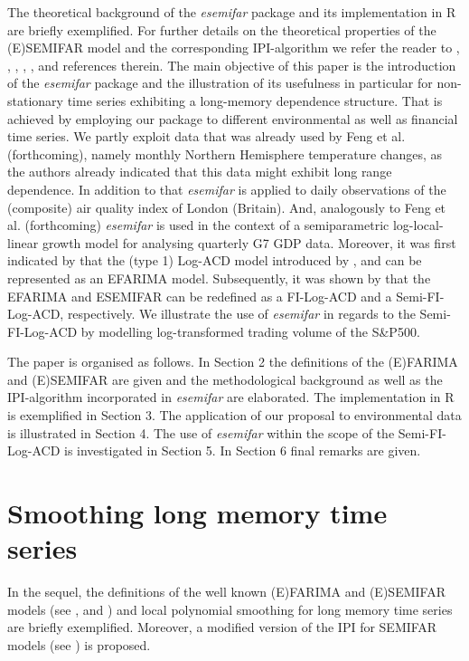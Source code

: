 \documentclass[12pt]{article}
\begin{document}
The theoretical background of the \textit{esemifar} package and its implementation in R are briefly exemplified. For further details on the theoretical properties of the (E)SEMIFAR model and the corresponding IPI-algorithm we refer the reader to \citet{beran1999semifar}, \citet{beran2002semifar}, \citet{beran2002iterative}, \citet{beran2002local}, \citet{beran2015modelling}, \citet{beran2016long} and references therein. The main objective of this paper is the introduction of the \textit{esemifar} package and the illustration of its usefulness in particular for non-stationary time series exhibiting a long-memory dependence structure. That is achieved by employing our package to different environmental as well as financial time series. We partly exploit data that was already used by Feng et al. (forthcoming), namely monthly Northern Hemisphere temperature changes, as the authors already indicated that this data might exhibit long range dependence. In addition to that \textit{esemifar} is applied to daily observations of the (composite) air quality index of London (Britain). And, analogously to Feng et al. (forthcoming) \textit{esemifar} is used in the context of a semiparametric log-local-linear growth model for analysing quarterly G7 GDP data. Moreover, it was first indicated by \citet{beran2015modelling} that the (type 1) Log-ACD model introduced by \citet{bauwens2000logarithmic}, \citet{bauwens2008moments} and \citet{karanasos2008statistical} can be represented as an EFARIMA model. Subsequently, it was shown by \citet{feng2015forecasting} that the EFARIMA and ESEMIFAR can be redefined as a FI-Log-ACD and a Semi-FI-Log-ACD, respectively. We illustrate the use of \textit{esemifar} in regards to the Semi-FI-Log-ACD by modelling log-transformed trading volume of the S\&P500.

The paper is organised as follows. In Section 2 the definitions of the (E)FARIMA and (E)SEMIFAR are given and the methodological background as well as the IPI-algorithm incorporated in \textit{esemifar} are elaborated. The implementation in R is exemplified in Section 3. The application of our proposal to environmental data is illustrated in Section 4. The use of \textit{esemifar} within the scope of the Semi-FI-Log-ACD is investigated in Section 5. In Section 6 final remarks are given.

\section{Smoothing long memory time series}
In the sequel, the definitions of the well known (E)FARIMA and (E)SEMIFAR models (see \cite{beran1999semifar}, \cite{beran2002semifar} and \cite{beran2015modelling}) and local polynomial smoothing for long memory time series are briefly exemplified. Moreover, a modified version of the 
IPI for SEMIFAR models (see \cite{beran2002iterative}) is proposed.
\end{document}
